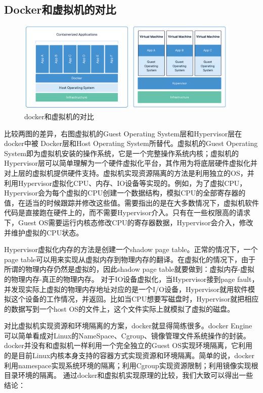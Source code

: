 \documentclass{article}
\begin{document}
\subsection{Docker和虚拟机的对比}
\begin{figure}[H]
    \centering
    \includegraphics[width=0.95\textwidth]{docker&VM.png}
    \caption{docker和虚拟机的对比}
    \label{fig:docker&VM}
    \end{figure}
比较两图的差异，右图虚拟机的Guest Operating System层和Hypervisor层在docker中被
Docker层和Host Operating System所替代。虚拟机的Guest Operating System即为虚拟机安装的操作系统，它是一个完整操作系统内核；虚拟机的Hypervisor层可以简单理解为一个硬件虚拟化平台，其作用为将底层硬件虚拟化并对上层的虚拟机提供硬件支持。虚拟机实现资源隔离的方法是利用独立的OS，并利用Hypervisor虚拟化CPU、内存、IO设备等实现的。例如，为了虚拟CPU，Hypervisor会为每个虚拟的CPU创建一个数据结构，模拟CPU的全部寄存器的值，在适当的时候跟踪并修改这些值。需要指出的是在大多数情况下，虚拟机软件代码是直接跑在硬件上的，而不需要Hypervisor介入。只有在一些权限高的请求下，Guest OS需要运行内核态修改CPU的寄存器数据，Hypervisor会介入，修改并维护虚拟的CPU状态。
\par

Hypervisor虚拟化内存的方法是创建一个shadow page table。正常的情况下，一个page table可以用来实现从虚拟内存到物理内存的翻译。在虚拟化的情况下，由于所谓的物理内存仍然是虚拟的，因此shadow page table就要做到：虚拟内存-虚拟的物理内存-真正的物理内存。
对于IO设备虚拟化，当Hypervisor接到page fault，并发现实际上虚拟的物理内存地址对应的是一个I/O设备，Hypervisor就用软件模拟这个设备的工作情况，并返回。比如当CPU想要写磁盘时，Hypervisor就把相应的数据写到一个host OS的文件上，这个文件实际上就模拟了虚拟的磁盘。
\par

对比虚拟机实现资源和环境隔离的方案，docker就显得简练很多。docker Engine可以简单看成对Linux的NameSpace、Cgroup、镜像管理文件系统操作的封装。docker并没有和虚拟机一样利用一个完全独立的Guest OS实现环境隔离，它利用的是目前Linux内核本身支持的容器方式实现资源和环境隔离。简单的说，docker利用namespace实现系统环境的隔离；利用Cgroup实现资源限制；利用镜像实现根目录环境的隔离。
通过docker和虚拟机实现原理的比较，我们大致可以得出一些结论：
\par
\end{document}
